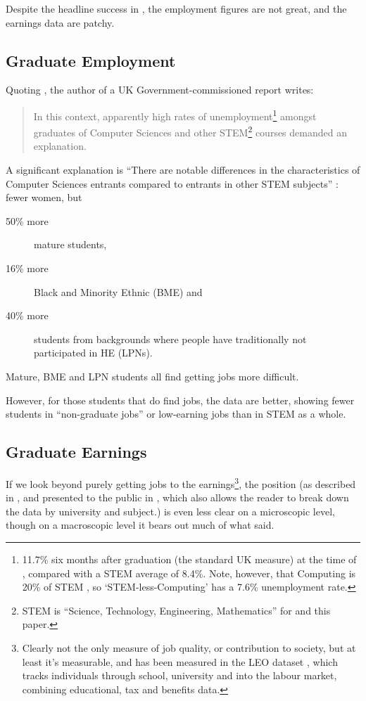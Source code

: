 \documentclass[sigconf]{acmart}
\begin{document}
Despite the headline success in \cite{BIS2011a}, the employment
figures are not great, and the earnings data are patchy.

\subsection{Graduate Employment}

Quoting \cite{UKCES2015b}, the author of a UK Government-commissioned
report \cite{Shadbolt2016a} writes:

\begin{quote} In this context, apparently high rates of
unemployment\footnote{11.7\% six months after graduation (the standard
UK measure) at the time of \cite{Shadbolt2016a}, compared with a STEM
average of 8.4\%. Note, however, that Computing is 20\% of STEM
\cite[Table 1]{Wakeham2016a}, so `STEM-less-Computing' has a 7.6\%
unemployment rate.} amongst graduates of Computer Sciences and other
STEM\footnote{STEM is ``Science, Technology, Engineering,
Mathematics'' for \cite{Shadbolt2016a} and this paper.} courses
demanded an explanation.
\end{quote}

A significant explanation is ``There are notable differences in the
characteristics of Computer Sciences entrants compared to entrants in
other STEM subjects'' \cite[\P2.6]{Shadbolt2016a}: fewer women, but

\begin{description}
\item[50\% more] mature students,
\item[16\% more]Black and Minority Ethnic (BME) and
\item[40\% more]students from backgrounds where people have
traditionally not participated in HE (LPNs).
\end{description}

Mature, BME and LPN students all find getting jobs more difficult.
\par However, for those students that do find jobs, the data are
better, showing \cite[Figure 6]{Shadbolt2016a} fewer students in
``non-graduate jobs'' or low-earning jobs than in STEM as a whole.

\subsection{Graduate Earnings}
If we look beyond purely getting jobs to the earnings\footnote{Clearly
not the only measure of job quality, or contribution to society, but
at least it's measurable, and has been measured in the LEO dataset
\cite{DfE2017a}, which tracks individuals through school, university
and into the labour market, combining educational, tax and benefits
data.}, the position (as described in \cite{DfE2018d}, and presented
to the public in \cite{BBC2018f}, which also allows the reader to
break down the data by university and subject.) is even less clear on
a microscopic level, though on a macroscopic level it bears out much
of what \cite{Shadbolt2016a} said.
\end{document}
